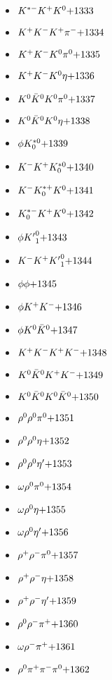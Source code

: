\begin{multicols}{3}
\begin{itemize}
 \item $ K^{*-} K^{+} K^{0} \hfill{+1333}$
 \item $ K^{+} K^{-} K^{+} \pi^{-} \hfill{+1334}$
 \item $ K^{+} K^{-} K^{0} \pi^{0} \hfill{+1335}$
 \item $ K^{+} K^{-} K^{0} \eta \hfill{+1336}$
 \item $ K^{0} \bar{K}^{0} K^{0} \pi^{0} \hfill{+1337}$
 \item $ K^{0} \bar{K}^{0} K^{0} \eta \hfill{+1338}$
 \item $ \phi K_{0}^{*0} \hfill{+1339}$
 \item $ K^{-} K^{+} K_{0}^{*0} \hfill{+1340}$
 \item $ K^{-} K_{0}^{*+} K^{0} \hfill{+1341}$
 \item $ K_{0}^{*-} K^{+} K^{0} \hfill{+1342}$
 \item $ \phi {K^{\prime}}_{1}^{0} \hfill{+1343}$
 \item $ K^{-} K^{+} {K^{\prime}}_{1}^{0} \hfill{+1344}$
 \item $ \phi \phi \hfill{+1345}$
 \item $ \phi K^{+} K^{-} \hfill{+1346}$
 \item $ \phi K^{0} \bar{K}^{0} \hfill{+1347}$
 \item $ K^{+} K^{-} K^{+} K^{-} \hfill{+1348}$
 \item $ K^{0} \bar{K}^{0} K^{+} K^{-} \hfill{+1349}$
 \item $ K^{0} \bar{K}^{0} K^{0} \bar{K}^{0} \hfill{+1350}$
 \item $ \rho^{0} \rho^{0} \pi^{0} \hfill{+1351}$
 \item $ \rho^{0} \rho^{0} \eta \hfill{+1352}$
 \item $ \rho^{0} \rho^{0} {\eta^{\prime}} \hfill{+1353}$
 \item $ \omega \rho^{0} \pi^{0} \hfill{+1354}$
 \item $ \omega \rho^{0} \eta \hfill{+1355}$
 \item $ \omega \rho^{0} {\eta^{\prime}} \hfill{+1356}$
 \item $ \rho^{+} \rho^{-} \pi^{0} \hfill{+1357}$
 \item $ \rho^{+} \rho^{-} \eta \hfill{+1358}$
 \item $ \rho^{+} \rho^{-} {\eta^{\prime}} \hfill{+1359}$
 \item $ \rho^{0} \rho^{-} \pi^{+} \hfill{+1360}$
 \item $ \omega \rho^{-} \pi^{+} \hfill{+1361}$
 \item $ \rho^{0} \pi^{+} \pi^{-} \pi^{0} \hfill{+1362}$

\end{itemize}
\end{multicols}

